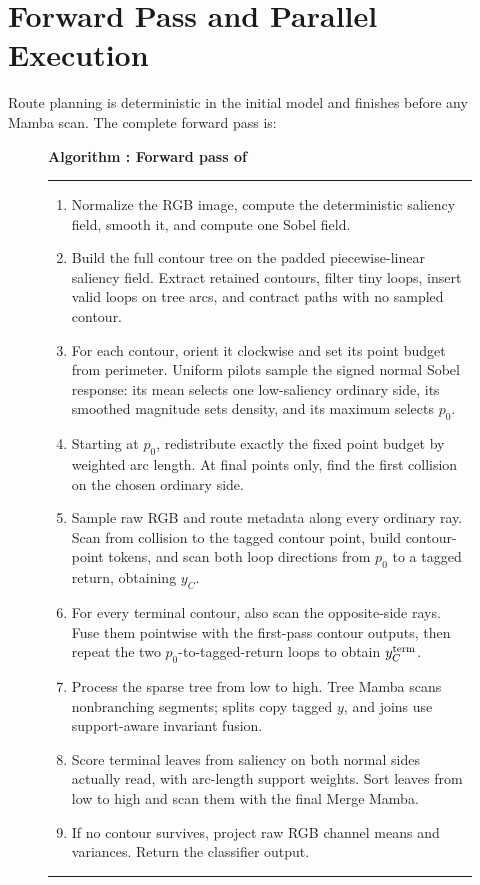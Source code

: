 \section{Forward Pass and Parallel Execution}
\label{sec:algorithm}

Route planning is deterministic in the initial model and finishes before any Mamba scan. The complete forward pass is:

\begin{figure}[t]
\label{alg:topocontour}
\small
\noindent\textbf{Algorithm \thealgorithm: Forward pass of \method}
\vspace{2pt}\hrule\vspace{3pt}
\begin{enumerate}[label=\arabic*.,leftmargin=1.5em,itemsep=1.5pt]
    \item Normalize the RGB image, compute the deterministic saliency field, smooth it, and compute one Sobel field.
    \item Build the full contour tree on the padded piecewise-linear saliency field. Extract retained contours, filter tiny loops, insert valid loops on tree arcs, and contract paths with no sampled contour.
    \item For each contour, orient it clockwise and set its point budget from perimeter. Uniform pilots sample the signed normal Sobel response: its mean selects one low-saliency ordinary side, its smoothed magnitude sets density, and its maximum selects $p_0$.
    \item Starting at $p_0$, redistribute exactly the fixed point budget by weighted arc length. At final points only, find the first collision on the chosen ordinary side.
    \item Sample raw RGB and route metadata along every ordinary ray. Scan from collision to the tagged contour point, build contour-point tokens, and scan both loop directions from $p_0$ to a tagged return, obtaining $y_C$.
    \item For every terminal contour, also scan the opposite-side rays. Fuse them pointwise with the first-pass contour outputs, then repeat the two $p_0$-to-tagged-return loops to obtain $y_C^{\rm term}$.
    \item Process the sparse tree from low to high. Tree Mamba scans nonbranching segments; splits copy tagged $y$, and joins use support-aware invariant fusion.
    \item Score terminal leaves from saliency on both normal sides actually read, with arc-length support weights. Sort leaves from low to high and scan them with the final Merge Mamba.
    \item If no contour survives, project raw RGB channel means and variances. Return the classifier output.
\end{enumerate}
\vspace{2pt}\hrule
\end{figure}


